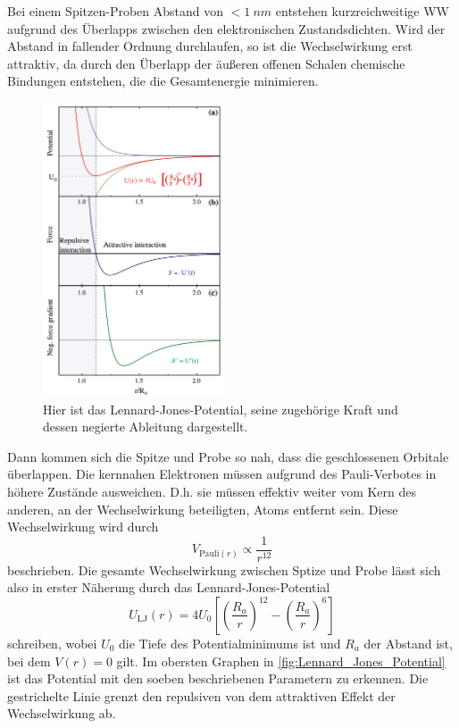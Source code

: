     Bei einem Spitzen-Proben Abstand von $< \SI{1}{nm}$ entstehen kurzreichweitige WW aufgrund des Überlapps zwischen den elektronischen Zustandsdichten.
    Wird der Abstand in fallender Ordnung durchlaufen, so ist die Wechselwirkung erst attraktiv, da durch den Überlapp der äußeren offenen Schalen chemische Bindungen entstehen, die die Gesamtenergie minimieren. \\
    \setlength{\columnsep}{10pt}
    \begin{figure}
        \centering{}
        \includegraphics[width=0.48\textwidth]{bilder/Lennard_Jones_Potential.png}
        \caption{Hier ist das Lennard-Jones-Potential, seine zugehörige Kraft und dessen negierte Ableitung dargestellt.} \vspace*{-0.5cm}
        \label{fig:Lennard_Jones_Potential}
    \end{figure}
    Dann kommen sich die Spitze und Probe so nah, dass die geschlossenen Orbitale überlappen.
    Die kernnahen Elektronen müssen aufgrund des Pauli-Verbotes in höhere Zustände ausweichen.
    D.h. sie müssen effektiv weiter vom Kern des anderen, an der Wechselwirkung beteiligten, Atoms entfernt sein.
    Diese Wechselwirkung wird durch
    \begin{equation}
        V_{\mathrm{Pauli}(r)} \propto \frac{1}{r^{12}}
    \end{equation}
    beschrieben.
    Die gesamte Wechselwirkung zwischen Sptize und Probe lässt sich also in erster Näherung durch das Lennard-Jones-Potential
    \begin{equation}
        U_{\mathrm{LJ}}(r) = 4 U_0 \left[\left(\frac{R_a}{r}\right)^{12} - \left(\frac{R_a}{r}\right)^6\right]
        \label{eqn:Lennard_Jones_Potential}
    \end{equation}
    schreiben, wobei $U_0$ die Tiefe des Potentialminimums ist und $R_a$ der Abstand ist, bei dem $V(r) = 0$ gilt.
    Im obersten Graphen in \autoref{fig:Lennard_Jones_Potential} ist das Potential mit den soeben beschriebenen Parametern zu erkennen.
    Die gestrichelte Linie grenzt den repulsiven von dem attraktiven Effekt der Wechselwirkung ab.

